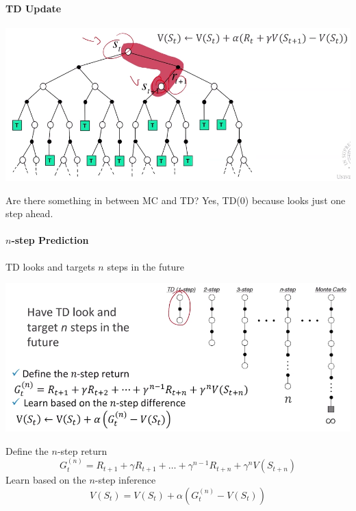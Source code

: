 \documentclass[10pt]{report}
\begin{document}
\paragraph{TD Update}
\begin{center}
	\includegraphics[scale=0.5]{168.png}
\end{center}
Are there something in between MC and TD? Yes, TD(0) because looks just one step ahead.
\paragraph{$n$-step Prediction} TD looks and targets $n$ steps in the future
\begin{center}
	\includegraphics[scale=0.5]{169.png}
\end{center}
Define the $n$-step return
$$G_t^{(n)} = R_{t+1}+\gamma R_{t+1}+\ldots+ \gamma^{n-1}R_{t+n} + \gamma^n V(S_{t+n})$$
Learn based on the $n$-step inference
$$V(S_t) = V(S_t) + \alpha\left(G_t^{(n)} - V(S_t)\right)$$
\end{document}
